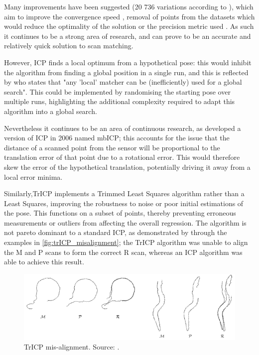 \documentclass[authoryearcitations]{UoYCSproject}
\begin{document}
Many improvements have been suggested (20 736 variations according to \citet{Donoso2017-wp}), which aim to improve the convergence speed \cite{Donoso2017-wp} \cite{Simon1996-dl}, removal of points from the datasets which would reduce the optimality of the solution \cite{Weik1997-px} \cite{Masuda1996-av} or the precision metric used \cite{Eggert1997-ak}. As such it continues to be a strong area of research, and can prove to be an accurate and relatively quick solution to scan matching.

However, ICP finds a local optimum from a hypothetical pose: this would inhibit the algorithm from finding a global position in a single run, and this is reflected by \citet{Censi2005-iv} who states that "any 'local' matcher can be (inefficiently) used for a global search". This could be implemented by randomising the starting pose over multiple runs, highlighting the additional complexity required to adapt this algorithm into a global search.

Nevertheless it continues to be an area of continuous research, as \citet{Minguez2006-nj} developed a version of ICP in 2006 named mbICP;  this accounts for the issue that the distance of a scanned point from the sensor will be proportional to the translation error of that point due to a rotational error. This would therefore skew the error of the hypothetical translation, potentially driving it away from a local error minima.

Similarly,TrICP \cite{Chetverikov2005-yz} implements a Trimmed Least Squares \cite{Ruppert1980-js} algorithm rather than a Least Squares, improving the robustness to noise or poor initial estimations of the pose. This functions on a subset of points, thereby preventing erroneous measurements or outliers from affecting the overall regression. The algorithm is not pareto dominant to a standard ICP, as demonstrated by \citeauthor{Chetverikov2005-yz} through the examples in \autoref{fig:trICP_misalignment}; the TrICP algorithm was unable to align the M and P scans to form the correct R scan, whereas an ICP algorithm was able to achieve this result. 


\begin{figure}[t]
	\centering
	\includegraphics[width=\textwidth,keepaspectratio]{images/trICP_misalignment.png}
	\caption[TrICP mis-alignment]{TrICP mis-alignment. Source: \citet{Chetverikov2005-yz}.}
	\label{fig:trICP_misalignment}
\end{figure}
\end{document}

